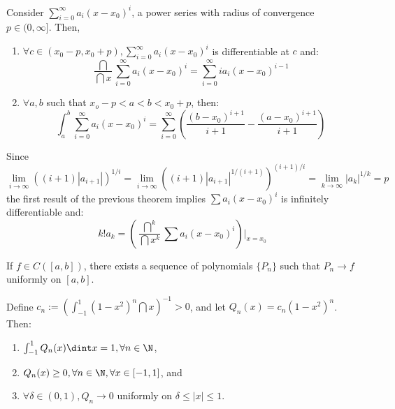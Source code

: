 \begin{theorem}
    Consider $\sum_{i=0}^\infty a_i(x - x_0)^i$, a power series with radius of convergence $p \in (0, \infty]$. Then,
    \begin{enumerate}
        \item $\forall c \in (x_0 - p, x_0 + p), \sum_{i=0}^\infty a_i(x - x_0)^i$ is differentiable at $c$ and:
            \begin{equation*}
                \frac{\dint}{\dint x} \sum \limits_{i=0}^\infty a_i(x - x_0)^i = \sum \limits_{i=0}^\infty i a_i (x - x_0)^{i-1}
            \end{equation*}
        \item $\forall a, b$ such that $x_o - p < a <  b < x_0 + p$, then:
            \begin{equation*}
                \int_a^b \sum \limits_{i = 0}^\infty a_i(x- x_0)^i = \sum \limits_{i=0}^\infty \left(
                    \frac{(b-x_0)^{i+1}}{i+1} - \frac{(a - x_0)^{i+1}}{i + 1}
                \right)
            \end{equation*}
    \end{enumerate}
\end{theorem}

\begin{remark}
    Since 
    \begin{equation*}
        \lim \limits_{i \to \infty} ((i+1)|a_{i+1}|)^{1/i} = \lim \limits_{i\to \infty} \left(
            (i+1)|a_{i+1}|^{1/(i+1)}
        \right)^{(i+1)/i} = \lim \limits_{k \to \infty} |a_k|^{1/k} = p
    \end{equation*}
    the first result of the previous theorem implies $\sum a_i(x - x_0)^i$ is infinitely differentiable and:
    \begin{equation*}
        k! a_k = \left(
            \frac{\dint^k}{\dint x^k} \sum a_i (x - x_0)^i
        \right) \Bigg |_{x = x_0}
    \end{equation*}
\end{remark}

\begin{theorem}
    If $f \in C([a,b])$, there exists a sequence of polynomials $\{ P_n\}$ such that $P_n \to f$ uniformly on $[a,b]$.
\end{theorem}

\begin{theorem}
    Define $c_n := (\int_{-1}^1 (1 - x^2)^n \dint x)^{-1} > 0$, and let $Q_n(x) = c_n(1 - x^2)^n$. Then:
    \begin{enumerate}
        \item $\int_{-1}^1 Q_n(x) \dint x = 1, \forall n \in \N$,
        \item $Q_n(x) \geq 0, \forall n \in \N, \forall x \in [-1, 1]$, and
        \item $\forall \delta \in (0,1), Q_n \to 0$ uniformly on $\delta \leq |x| \leq 1$.
    \end{enumerate}
\end{theorem}

